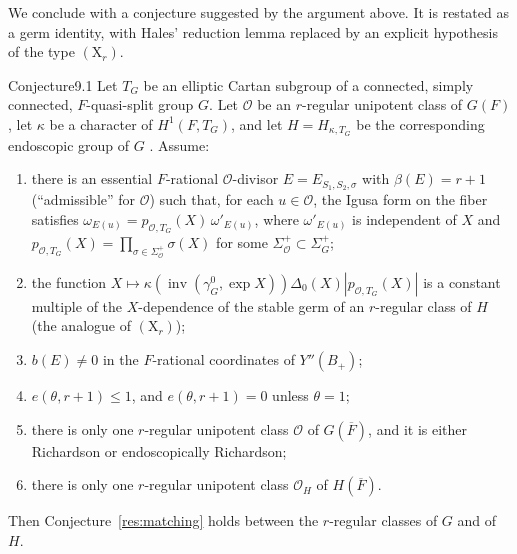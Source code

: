 \documentclass[12pt,letterpaper]{amsart}
\theoremstyle{plain}
\theoremstyle{definition}
\theoremstyle{remark}
\theoremstyle{definition}
\DeclareMathOperator{\inv}{inv}
\begin{document}
We conclude with a conjecture suggested by the argument above. It is
restated as a germ identity, with Hales' reduction lemma replaced by an
explicit hypothesis of the type $(\mathrm X_r)$.

\begin{res}{Conjecture}{9.1}\label{res:9.1}
Let $T_G$ be an elliptic Cartan subgroup
of a connected, simply connected, $F$-quasi-split group $G$. Let
${\mathcal O}$ be an $r$-regular unipotent class of $G(F)$,
let $\kappa$ be a character of $H^1(F,T_G)$, and let
$H=H_{\kappa,T_G}$ be the corresponding endoscopic group of $G$ \cite{La79}.
Assume:
\begin{enumerate}[(1)]
\item there is an essential $F$-rational ${\mathcal O}$-divisor
$E=E_{S_1,S_2,\sigma}$ with $\beta(E)=r+1$ (``admissible'' for ${\mathcal O}$)
such that, for each $u\in {\mathcal O}$, the
Igusa form on the fiber satisfies
$\omega_{E(u)}=p_{{\mathcal O},T_G}(X)\,\omega'_{E(u)}$,
where $\omega'_{E(u)}$ is independent of $X$ and
$p_{{\mathcal O},T_G}(X)=\prod_{\sigma\in\Sigma_{\mathcal O}^+}\sigma(X)$
for some $\Sigma_{\mathcal O}^+\subset \Sigma_G^+$;
\item the function $X\mapsto\kappa(\inv(\gamma_G^0,\exp X))\Delta_0(X)
|p_{{\mathcal O},T_G}(X)|$ is a constant multiple of the $X$-dependence of
the stable germ of an $r$-regular class of $H$ (the analogue of
$(\mathrm X_r)$);
\item $b(E)\not= 0$ in the $F$-rational coordinates of $Y''(B_+)$;
\item $e(\theta,r+1)\leq 1$, and $e(\theta,r+1)=0$ unless $\theta =1$;
\item there is only one $r$-regular unipotent class ${\mathcal O}$
of $G(\overline{F})$, and
it is either Richardson or endoscopically Richardson;
\item there is only one $r$-regular unipotent class ${\mathcal O}_H$ of
$H(\overline{F})$.
\end{enumerate}
Then Conjecture~\ref{res:matching} holds between the $r$-regular classes
of $G$ and of $H$.
\end{res}
\end{document}
